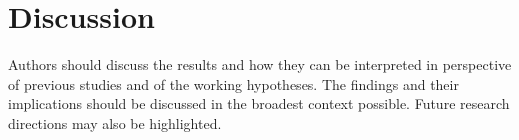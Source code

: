 \documentclass[sensors,article,submit,moreauthors,pdftex]{Definitions/mdpi}
\begin{document}

%

\section{Discussion}

Authors should discuss the results and how they can be interpreted in perspective of previous studies and of the working hypotheses. The findings and their implications should be discussed in the broadest context possible. Future research directions may also be highlighted.

%
%
%
\end{document}
